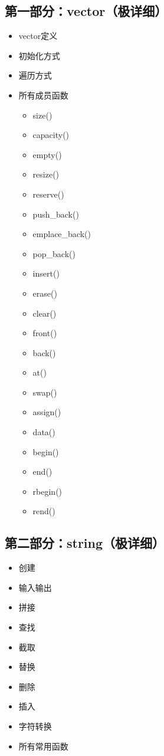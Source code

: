 \documentclass[9pt,twocolumn]{extarticle}
\begin{document}
\subsection*{第一部分：vector（极详细）}
\begin{itemize}
    \item vector定义
    \item 初始化方式
    \item 遍历方式
    \item 所有成员函数
    \begin{itemize}
        \item size()
        \item capacity()
        \item empty()
        \item resize()
        \item reserve()
        \item push\_back()
        \item emplace\_back()
        \item pop\_back()
        \item insert()
        \item erase()
        \item clear()
        \item front()
        \item back()
        \item at()
        \item swap()
        \item assign()
        \item data()
        \item begin()
        \item end()
        \item rbegin()
        \item rend()
    \end{itemize}
\end{itemize}

\subsection*{第二部分：string（极详细）}
\begin{itemize}
    \item 创建
    \item 输入输出
    \item 拼接
    \item 查找
    \item 截取
    \item 替换
    \item 删除
    \item 插入
    \item 字符转换
    \item 所有常用函数
\end{itemize}
\end{document}
